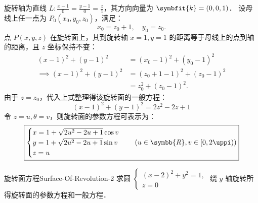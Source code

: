 \begin{solution}
    旋转轴为直线 $L: \frac{x-1}{0} = \frac{y-1}{0} = \frac{z}{1}$，其方向向量为 $\symbfit{k} = (0, 0, 1)$．
    设母线上任一点为 $P_0(x_0, y_0, z_0)$，满足：
    \begin{equation}
        x_0 = z_0 + 1, \quad y_0 = z_0.
    \end{equation}
    点 $P(x, y, z)$ 在旋转面上，其到旋转轴 $x=1, y=1$ 的距离等于母线上的点到轴的距离，且 $z$ 坐标保持不变：
    \begin{equation}
        \begin{aligned}
            (x - 1)^2 + (y - 1)^2          & = (x_0 - 1)^2 + (y_0 - 1)^2     \\
            \implies (x - 1)^2 + (y - 1)^2 & = (z_0 + 1 - 1)^2 + (z_0 - 1)^2 \\
                                           & = z_0^2 + (z_0 - 1)^2.
        \end{aligned}
    \end{equation}
    由于 $z = z_0$，代入上式整理得该旋转面的一般方程：
    \begin{equation}
        \boxed{(x - 1)^2 + (y - 1)^2 = 2z^2 - 2z + 1}
    \end{equation}
    令 $z = u, \theta = v$，则旋转面的参数方程可表示为：
    \begin{equation}
        \boxed{\begin{cases}
            x = 1 + \sqrt{2u^2 - 2u + 1} \cos v \\
            y = 1 + \sqrt{2u^2 - 2u + 1} \sin v \\
            z = u
        \end{cases} \quad (u \in \symbb{R}, v \in [0, 2\uppi))}
    \end{equation}
\end{solution}


\begin{problem}{旋转面方程}{Surface-Of-Revolution-2}
    求圆 $\begin{cases} (x - 2)^2 + y^2 = 1, \\ z = 0 \end{cases}$ 绕 $y$ 轴旋转所得旋转面的参数方程和一般方程．
\end{problem}

